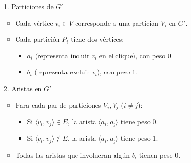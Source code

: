 \documentclass[letterpaper, 12pt]{report}
\begin{document}
\begin{itemize}
    \item[1.] Particiones de $ G' $
    \begin{itemize}
        \item Cada vértice $ v_i \in V $ corresponde a una partición $ V_i $ en $ G' $.  
        \item Cada partición $ P_i $ tiene dos vértices:  
        \begin{itemize}
            \item $ a_i $ (representa incluir $ v_i $ en el clique), con peso 0. 
            \item $ b_i $ (representa excluir $ v_i $), con peso 1.  
        \end{itemize}
    \end{itemize}
    \item[2.] Aristas en $ G' $
    \begin{itemize}
        \item Para cada par de particiones $ V_i, V_j $ ($ i \neq j $): 
        \begin{itemize}
            \item Si $ \langle v_i, v_j \rangle \in E $, la arista $ \langle a_i, a_j \rangle $ tiene peso 0.  
            \item Si $ \langle v_i, v_j \rangle \notin E $, la arista $ \langle a_i, a_j \rangle $ tiene peso 1.  
        \end{itemize}
        \item Todas las aristas que involucran algún $ b_i $ tienen peso $ 0 $.  
    \end{itemize}    
\end{itemize}


\end{document}
